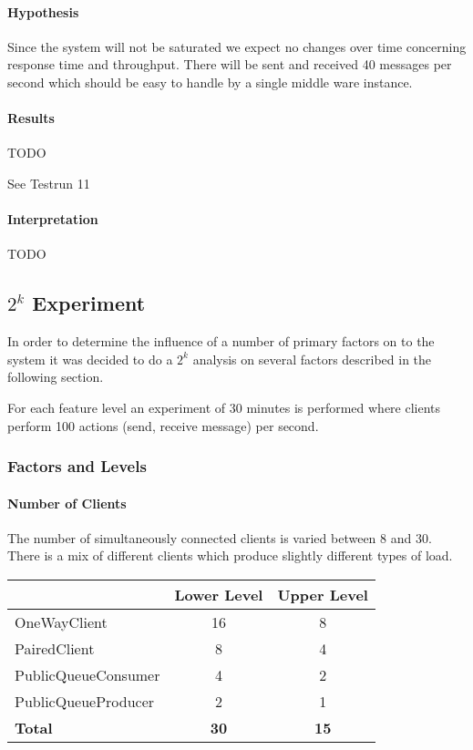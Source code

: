 \documentclass[milestone1.tex]{subfiles}
\begin{document}
\paragraph{Hypothesis}
Since the system will not be saturated we expect no changes over time concerning response time and throughput. There will be sent and received 40 messages per second which should be easy to handle by a single middle ware instance.

\paragraph{Results}

TODO

See Testrun 11


\paragraph{Interpretation}

TODO
\subsection{$2^k$ Experiment}
In order to determine the influence of a number of primary factors on to the system it was decided to do a $2^k$ analysis on several factors described in the following section.

For each feature level an experiment of 30 minutes is performed where clients perform 100 actions (send, receive message) per second.

\subsubsection{Factors and Levels}

\paragraph{Number of Clients}
The number of simultaneously connected clients is varied between 8 and 30. There is a mix of different clients which produce slightly different types of load.

\begin{tabular}{|l|c|c|}
\hline 
 & Lower Level & Upper Level \\ 
\hline 
OneWayClient & 16 & 8  \\ 
\hline 
PairedClient & 8 & 4 \\ 
\hline 
PublicQueueConsumer & 4 & 2 \\ 
\hline 
PublicQueueProducer & 2 & 1 \\ 
\hline 
\textbf{Total}  & \textbf{30} & \textbf{15} \\
\hline 
\end{tabular} 
\end{document}
